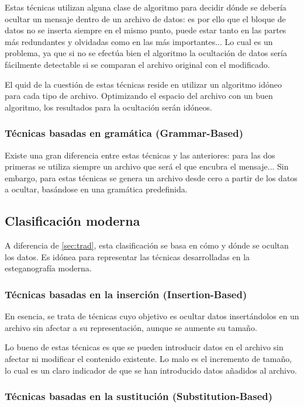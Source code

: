 Estas técnicas utilizan alguna clase de algoritmo para decidir dónde se debería ocultar un mensaje dentro de un archivo de datos: es por ello que el bloque de datos no se inserta siempre en el mismo punto, puede estar tanto en las partes más redundantes y olvidadas como en las más importantes... Lo cual es un problema, ya que si no se efectúa bien el algoritmo la ocultación de datos sería fácilmente detectable si se comparan el archivo original con el modificado. %

El quid de la cuestión de estas técnicas reside en utilizar un algoritmo idóneo para cada tipo de archivo. Optimizando el espacio del archivo con un buen algoritmo, los resultados para la ocultación serán idóneos.

\subsubsection{Técnicas basadas en gramática (Grammar-Based)}

Existe una gran diferencia entre estas técnicas y las anteriores: para las dos primeras se utiliza siempre un archivo que será el que encubra el mensaje... Sin embargo, para estas técnicas se genera un archivo desde cero a partir de los datos a ocultar, basándose en una gramática predefinida. %

\subsection{Clasificación moderna}

A diferencia de \ref{sec:trad}, esta clasificación se basa en cómo y dónde se ocultan los datos. Es idónea para representar las técnicas desarrolladas en la esteganografía moderna.

\subsubsection{Técnicas basadas en la inserción (Insertion-Based)}

En esencia, se trata de técnicas cuyo objetivo es ocultar datos insertándolos en un archivo sin afectar a su representación, aunque se aumente su tamaño.

Lo bueno de estas técnicas es que se pueden introducir datos en el archivo sin afectar ni modificar el contenido existente. Lo malo es el incremento de tamaño, lo cual es un claro indicador de que se han introducido datos añadidos al archivo.

\subsubsection{Técnicas basadas en la sustitución (Substitution-Based)}

